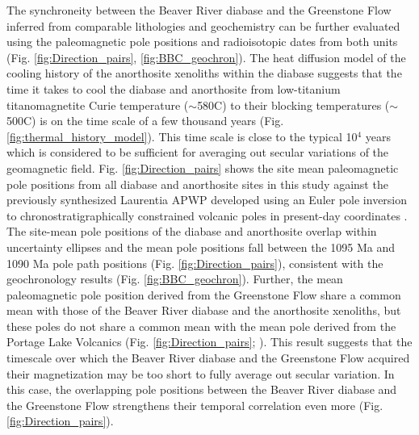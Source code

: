 The synchroneity between the Beaver River diabase and the Greenstone Flow inferred from comparable lithologies and geochemistry can be further evaluated using the paleomagnetic pole positions and radioisotopic dates from both units (Fig. \ref{fig:Direction_pairs}, \ref{fig:BBC_geochron}). The heat diffusion model of the cooling history of the anorthosite xenoliths within the diabase suggests that the time it takes to cool the diabase and anorthosite from low-titanium titanomagnetite Curie temperature ($\sim$580\textdegree C) to their blocking temperatures ($\sim$500\textdegree C) is on the time scale of a few thousand years (Fig. \ref{fig:thermal_history_model}). This time scale is close to the typical 10$^4$ years which is considered to be sufficient for averaging out secular variations of the geomagnetic field. Fig. \ref{fig:Direction_pairs} shows the site mean paleomagnetic pole positions from all diabase and anorthosite sites in this study against the previously synthesized Laurentia APWP developed using an Euler pole inversion to chronostratigraphically constrained volcanic poles in present-day coordinates \cite{Swanson-Hysell2019a}. The site-mean pole positions of the diabase and anorthosite overlap within uncertainty ellipses and the mean pole positions fall between the 1095 Ma and 1090 Ma pole path positions (Fig. \ref{fig:Direction_pairs}), consistent with the geochronology results (Fig. \ref{fig:BBC_geochron}). Further, the mean paleomagnetic pole position derived from the Greenstone Flow share a common mean with those of the Beaver River diabase and the anorthosite xenoliths, but these poles do not share a common mean with the mean pole derived from the Portage Lake Volcanics (Fig. \ref{fig:Direction_pairs}; ). This result suggests that the timescale over which the Beaver River diabase and the Greenstone Flow acquired their magnetization may be too short to fully average out secular variation. In this case, the overlapping pole positions between the Beaver River diabase and the Greenstone Flow strengthens their temporal correlation even more (Fig. \ref{fig:Direction_pairs}). 

